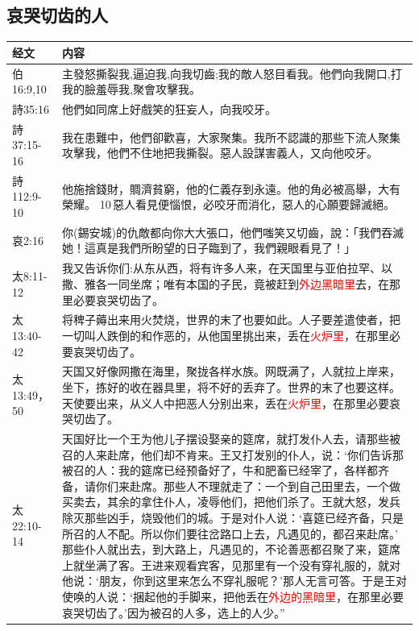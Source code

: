 \subsection{哀哭切齿的人}
\begin{table}[H]
  \centering
  \begin{tabular}{p{4.2em}|p{44.3em}}  \toprule
 经文 &   内容   \\ \midrule
伯16:9,10&主發怒撕裂我,逼迫我,向我切齒;我的敵人怒目看我。他們向我開口,打我的臉羞辱我,聚會攻擊我。 \\ \midrule
詩35:16&他們如同席上好戲笑的狂妄人，向我咬牙。 \\ \midrule
詩37:15-16&我在患難中，他們卻歡喜，大家聚集。我所不認識的那些下流人聚集攻擊我，他們不住地把我撕裂。惡人設謀害義人，又向他咬牙。 \\ \midrule
詩112:9-10&他施捨錢財，賙濟貧窮，他的仁義存到永遠。他的角必被高舉，大有榮耀。
10 惡人看見便惱恨，必咬牙而消化，惡人的心願要歸滅絕。\\ \midrule
哀2:16&你(錫安城)的仇敵都向你大大張口，他們嗤笑又切齒，說：「我們吞滅她！這真是我們所盼望的日子臨到了，我們親眼看見了！」 \\ \midrule
太8:11-12 &我又告诉你们:从东从西，将有许多人来，在天国里与亚伯拉罕、以撒、雅各一同坐席；唯有本国的子民，竟被赶到\textcolor{red}{外边黑暗里}去，在那里必要哀哭切齿了。\\    \midrule
太13:40-42 & 将稗子薅出来用火焚烧，世界的末了也要如此。人子要差遣使者，把一切叫人跌倒的和作恶的，从他国里挑出来，丢在\textcolor{red}{火炉里}，在那里必要哀哭切齿了。\\ \midrule   
太13:49，50 & 天国又好像网撒在海里，聚拢各样水族。网既满了，人就拉上岸来，坐下，拣好的收在器具里，将不好的丢弃了。世界的末了也要这样。天使要出来，从义人中把恶人分别出来，丢在\textcolor{red}{火炉里}，在那里必要哀哭切齿了。\\ \midrule

太22:10-14 &天国好比一个王为他儿子摆设娶亲的筵席，就打发仆人去，请那些被召的人来赴席，他们却不肯来。王又打发别的仆人，说：‘你们告诉那被召的人：我的筵席已经预备好了，牛和肥畜已经宰了，各样都齐备，请你们来赴席。那些人不理就走了：一个到自己田里去，一个做买卖去，其余的拿住仆人，凌辱他们，把他们杀了。王就大怒，发兵除灭那些凶手，烧毁他们的城。于是对仆人说：‘喜筵已经齐备，只是所召的人不配。所以你们要往岔路口上去，凡遇见的，都召来赴席。’ 那些仆人就出去，到大路上，凡遇见的，不论善恶都召聚了来，筵席上就坐满了客。王进来观看宾客，见那里有一个没有穿礼服的，就对他说：‘朋友，你到这里来怎么不穿礼服呢？’那人无言可答。于是王对使唤的人说：‘捆起他的手脚来，把他丢在\textcolor{red}{外边的黑暗里}，在那里必要哀哭切齿了。’因为被召的人多，选上的人少。”\\ \midrule


\end{tabular}
\end{table}
